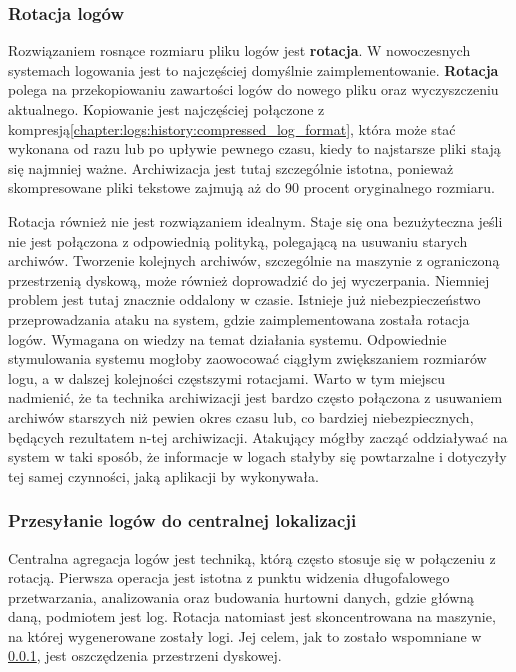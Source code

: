         \subsubsection{Rotacja logów}
        \label{chapter:logs:collecting:rotation}
        Rozwiązaniem rosnące rozmiaru pliku logów jest \textbf{rotacja}. W nowoczesnych systemach logowania
        jest to najczęściej domyślnie zaimplementowanie. \textbf{Rotacja} polega na przekopiowaniu 
        zawartości logów do nowego pliku oraz wyczyszczeniu aktualnego. Kopiowanie jest najczęściej połączone
        z kompresją\ref{chapter:logs:history:compressed_log_format}, która może stać wykonana od razu lub po upływie pewnego czasu, kiedy to najstarsze
        pliki stają się najmniej ważne. Archiwizacja jest tutaj szczególnie istotna, ponieważ
        skompresowane pliki tekstowe zajmują aż do 90 procent oryginalnego rozmiaru.
        
        Rotacja również nie jest rozwiązaniem idealnym. Staje się ona bezużyteczna jeśli nie jest połączona
        z odpowiednią polityką, polegającą na usuwaniu starych archiwów. Tworzenie kolejnych archiwów,
        szczególnie na maszynie z ograniczoną przestrzenią dyskową, może również doprowadzić do jej wyczerpania.
        Niemniej problem jest tutaj znacznie oddalony w czasie. Istnieje już niebezpieczeństwo przeprowadzania
        ataku na system, gdzie zaimplementowana została rotacja logów. Wymagana on wiedzy na temat działania systemu.
        Odpowiednie stymulowania systemu mogłoby zaowocować ciągłym zwiększaniem rozmiarów logu, a w dalszej kolejności
        częstszymi rotacjami. Warto w tym miejscu nadmienić, że ta technika archiwizacji jest bardzo często
        połączona z usuwaniem archiwów starszych niż pewien okres czasu lub, co bardziej niebezpiecznych, będących
        rezultatem n-tej archiwizacji. Atakujący mógłby zacząć oddziaływać na system w taki sposób, że informacje
        w logach stałyby się powtarzalne i dotyczyły tej samej czynności, jaką aplikacji by wykonywała.
        
        \subsubsection{Przesyłanie logów do centralnej lokalizacji}
        \label{chapter:logs:collecting:central_location}
        Centralna agregacja logów jest techniką, którą często stosuje się w połączeniu z rotacją.
        Pierwsza operacja jest istotna z punktu widzenia długofalowego przetwarzania, analizowania oraz
        budowania hurtowni danych, gdzie główną daną, podmiotem jest log. Rotacja natomiast jest skoncentrowana
        na maszynie, na której wygenerowane zostały logi. Jej celem, jak to zostało wspomniane w \ref{chapter:logs:collecting:rotation},
        jest oszczędzenia przestrzeni dyskowej.
    
